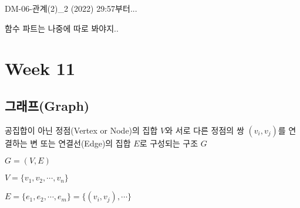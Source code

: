 DM-06-관계(2)_2 (2022) 29:57부터...

함수 파트는 나중에 따로 봐야지..

\newpage
\section{Week 11}
\subsection{그래프(Graph)}
공집합이 아닌 정점(Vertex or Node)의 집합 $V$와 서로 다른 정점의 쌍 $(v_i, v_j)$를 연결하는 변 또는 연결선(Edge)의 집합 $E$로 구성되는 구조 $G$

$G = (V, E)$

$V = \{v_1, v_2, \cdots, v_n\}$

$E = \{e_1, e_2, \cdots, e_m\} = \{(v_i, v_j), \cdots\}$\\

